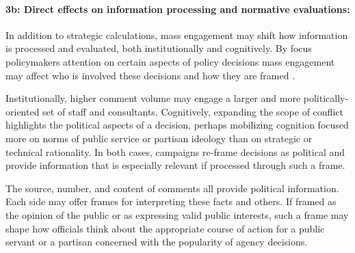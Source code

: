 \paragraph{3b: Direct effects on information processing and normative evaluations:}
In addition to strategic calculations, mass engagement may shift how information is processed and evaluated, both institutionally and cognitively. %
By focus policymakers attention on certain aspects of policy decisions mass engagement may affect who is involved these decisions and how they are framed \citep{Rinfret2011}.

Institutionally, higher comment volume may engage a larger and more politically-oriented set of staff and consultants. Cognitively, expanding the scope of conflict highlights the political aspects of a decision, perhaps mobilizing cognition focused more on norms of public service or partisan ideology than on strategic or technical rationality. In both cases, campaigns re-frame decisions as political and provide information that is especially relevant if processed through such a frame.

The source, number, and content of comments all provide political information. Each side may offer frames for interpreting these facts and others. If 
framed as the opinion of the public or as expressing valid public interests, such a frame may shape how officials think about the appropriate course of action for a public servant or a partisan concerned with the popularity of agency decisions. 


